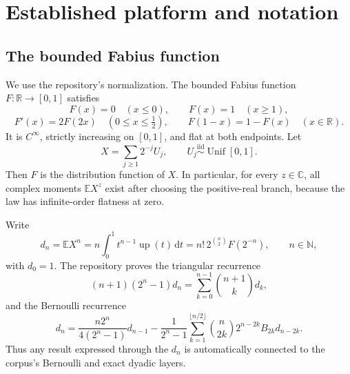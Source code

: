 \documentclass[11pt,oneside]{article}
\theoremstyle{definition}
\theoremstyle{remark}
\newcommand{\Up}{\operatorname{up}}
\newcommand{\E}{\mathbb E}
\newcommand{\R}{\mathbb R}
\newcommand{\C}{\mathbb C}
\newcommand{\N}{\mathbb N}
\newcommand{\dd}{\,\mathrm d}
\newcommand{\1}{\mathbf 1}
\begin{document}
\section{Established platform and notation}
\label{p2:sec:platform}

\subsection{The bounded Fabius function}
We use the repository's normalization.  The bounded Fabius function
$F:\R\to[0,1]$ satisfies
\begin{equation}
 F(x)=0\quad(x\le0),\qquad F(x)=1\quad(x\ge1),             \label{p2:eq:F-exterior}
\end{equation}
\begin{equation}
 F'(x)=2F(2x)\quad(0\le x\le\tfrac12),\qquad
 F(1-x)=1-F(x)\quad(x\in\R).                              \label{p2:eq:F-basic}
\end{equation}
It is $C^\infty$, strictly increasing on $[0,1]$, and flat at both endpoints.
Let
\begin{equation}
 X=\sum_{j\ge1}2^{-j}U_j,
 \qquad U_j\stackrel{\mathrm{iid}}{\sim}\operatorname{Unif}[0,1]. \label{p2:eq:X-random}
\end{equation}
Then $F$ is the distribution function of $X$.  In particular, for every
$z\in\C$, all complex moments $\E X^z$ exist after choosing the positive-real
branch, because the law has infinite-order flatness at zero.

Write
\begin{equation}
 d_n=\E X^n
     =n\int_0^1t^{n-1}\Up(t)\dd t
     =n!\,2^{\binom n2}F(2^{-n}),\qquad n\in\N,             \label{p2:eq:d-moments}
\end{equation}
with $d_0=1$.  The repository proves the triangular recurrence
\begin{equation}
 (n+1)(2^n-1)d_n=\sum_{k=0}^{n-1}\binom{n+1}{k}d_k,         \label{p2:eq:d-recurrence}
\end{equation}
and the Bernoulli recurrence
\begin{equation}
 d_n=\frac{n2^n}{4(2^n-1)}d_{n-1}
 -\frac1{2^n-1}\sum_{k=1}^{\lfloor n/2\rfloor}
 \binom n{2k}2^{n-2k}B_{2k}d_{n-2k}.                       \label{p2:eq:d-bernoulli}
\end{equation}
Thus any result expressed through the $d_n$ is automatically connected to the
corpus's Bernoulli and exact dyadic layers.
\end{document}
